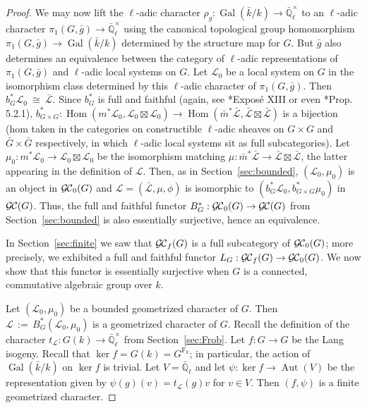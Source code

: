 \documentclass[11pt]{amsart}
\theoremstyle{plain}
\theoremstyle{definition}
\theoremstyle{remark}
\newcommand{\EE}{\mathbb{\bar Q}_\ell}
\newcommand{\bFq}{\bar{k}}
\newcommand{\Fq}{k}
\newcommand{\EEx}{\EE^\times}
\DeclareMathOperator{\Gal}{Gal}
\newcommand{\Frob}[1]{{\operatorname{F}_{#1}}}
\DeclareMathOperator{\Aut}{Aut}
\DeclareMathOperator{\Hom}{Hom}
\newcommand{\ceq}{{\, :=\, }}
\newcommand{\iso}{{\ \cong\ }}
\newcommand{\cs}[1]{{\mathcal{#1}}}
\newcommand{\gcs}[1]{{\mathcal{\bar #1}}}
\newcommand{\GC}{{\mathcal{G\hskip-0.8pt C}}}
\newcommand{\GCb}{{\GC_0}}
\newcommand{\GCf}{{\GC_f}}
\newcommand{\trFrob}[1]{t_{#1}}
\newcommand{\bg}{\bar{g}}
\begin{document}
\begin{proof}
  We may now lift the $\ell$-adic character $\rho_g : \Gal(\bFq/\Fq) \to \EEx$
  to an $\ell$-adic character $\pi_1(G,\bg) \to \EEx$ using the canonical topological group homomorphism
  $\pi_1(G,\bg) \to \Gal(\bFq/\Fq)$ determined by the structure map for $G$. But $\bg$ also
  determines an equivalence between the category of $\ell$-adic
  representations of $\pi_1(G,\bg)$ and $\ell$-adic local systems on $G$. Let
  $\cs{L}_0$ be a local system on $G$ in the isomorphism class
  determined by this $\ell$-adic character of $\pi_1(G,\bg)$.
  Then $b_G^*\cs{L}_0 \iso \gcs{L}$.
  Since $b_G^*$ is full and faithful (again, see \cite{SGA7.2}*{Expos\'e XIII} or even \cite{BBD}*{Prop. 5.2.1}),
  $
  b_{G\times G}^* : \Hom(m^*\cs{L}_0,\cs{L}_0\boxtimes\cs{L}_0) \to \Hom({\bar m}^*\gcs{L},\gcs{L}\boxtimes\gcs{L})
  $ 
  is a bijection 
  (hom taken in the categories on constructible $\ell$-adic sheaves on 
  $G\times G$ and ${\bar G}\times {\bar G}$ respectively, 
  in which $\ell$-adic local systems sit as full subcategories). 
  Let $\mu_0 : m^*\cs{L}_0 \to \cs{L}_0\boxtimes\cs{L}_0$ be the isomorphism matching 
  $\mu : {\bar m}^*\gcs{L} \to \gcs{L}\boxtimes\gcs{L}$, 
  the latter appearing in the definition of $\cs{L}$. 
  Then, as in Section~\ref{sec:bounded}, $(\cs{L}_0,\mu_0)$ is an object in $\GCb(G)$ 
  and $\cs{L} = (\gcs{L},\mu,\phi)$ is isomorphic to $(b_G^*\cs{L}_0,b_{G\times G}^*\mu_0)$ in $\GC(G)$.
  Thus, the full and faithful functor $B_G^* : \GCb(G) \to \GC(G)$ from Section~\ref{sec:bounded}
  is also essentially surjective, hence an equivalence.
  
  In Section~\ref{sec:finite} we saw that $\GCf(G)$ is a full subcategory of $\GCb(G)$;
  more precisely, we exhibited a full and faithful functor $L_G : \GCf(G) \to \GCb(G)$.
  We now show that this functor is essentially surjective 
  when $G$ is a connected, commutative algebraic group over $\Fq$.
  
  Let $(\cs{L}_0,\mu_0)$ be a bounded geometrized character of $G$. 
  Then $\cs{L}\ceq B_G^*(\cs{L}_0,\mu_0)$ is a geometrized character of $G$.
  Recall the definition of the character $\trFrob{\cs{L}} : G(\Fq) \to \EEx$ from Section~\ref{sec:Frob}. 
  Let $f : G\to G$ be the Lang isogeny.
  Recall that $\ker f = G(\Fq) = G^\Frob{\Fq}$; 
  in particular, the action of $\Gal(\bFq/\Fq)$ on $\ker f$ is trivial.
  Let $V = \EE$ and let $\psi : \ker f \to \Aut(V)$ be the representation given by 
  $\psi(g)(v) = \trFrob{\cs{L}}(g) v$ for $v\in V$. 
  Then $(f,\psi)$ is a finite geometrized character. 
  

\end{proof}
\end{document}
